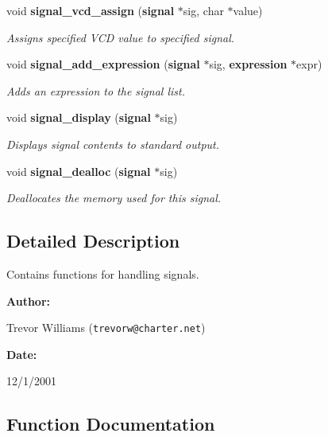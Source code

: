 \begin{CompactItemize}
void {\bf signal\_\-vcd\_\-assign} ({\bf signal} $\ast$sig, char $\ast$value)
\begin{CompactList}\small\item\em Assigns specified VCD value to specified signal.\item\end{CompactList}\item 
void {\bf signal\_\-add\_\-expression} ({\bf signal} $\ast$sig, {\bf expression} $\ast$expr)
\begin{CompactList}\small\item\em Adds an expression to the signal list.\item\end{CompactList}\item 
void {\bf signal\_\-display} ({\bf signal} $\ast$sig)
\begin{CompactList}\small\item\em Displays signal contents to standard output.\item\end{CompactList}\item 
void {\bf signal\_\-dealloc} ({\bf signal} $\ast$sig)
\begin{CompactList}\small\item\em Deallocates the memory used for this signal.\item\end{CompactList}\end{CompactItemize}


\subsection{Detailed Description}
Contains functions for handling signals.



\begin{Desc}
\item[{\bf Author: }]\par
Trevor Williams ({\tt trevorw@charter.net}) \end{Desc}
\begin{Desc}
\item[{\bf Date: }]\par
12/1/2001

\end{Desc}


\subsection{Function Documentation}
